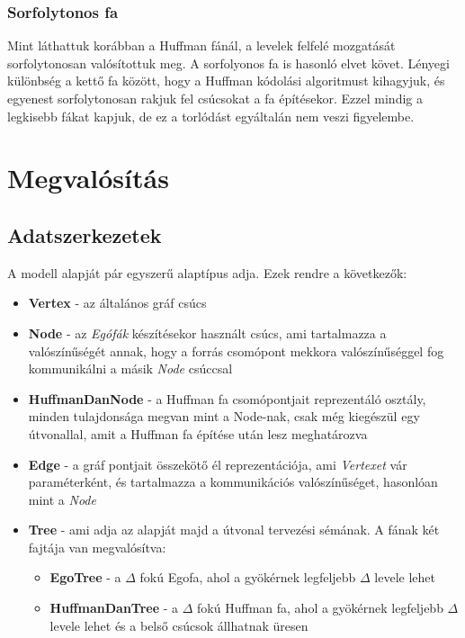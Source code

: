 \documentclass[12pt]{report}
\begin{document}
\subsection{Sorfolytonos fa}

Mint láthattuk korábban a Huffman fánál, a levelek felfelé mozgatását sorfolytonosan valósítottuk meg. A sorfolyonos fa is hasonló elvet követ.
Lényegi különbség a kettő fa között, hogy a Huffman kódolási algoritmust kihagyjuk, és egyenest sorfolytonosan rakjuk fel csúcsokat a fa építésekor.
Ezzel mindig a legkisebb fákat kapjuk, de ez a torlódást egyáltalán nem veszi figyelembe.

\chapter{Megvalósítás}


\section{Adatszerkezetek}

A modell alapját pár egyszerű alaptípus adja. Ezek rendre a következők:
\begin{itemize}
	\item \textbf{Vertex} - az általános gráf csúcs
	\item \textbf{Node} - az \textit{Egófák} készítésekor használt csúcs, ami tartalmazza a valószínűségét annak, hogy a forrás csomópont mekkora valószínűséggel fog kommunikálni a másik \textit{Node} csúccsal
	\item \textbf{HuffmanDanNode} - a Huffman fa csomópontjait reprezentáló osztály, minden tulajdonsága megvan mint a Node-nak, csak még kiegészül egy útvonallal, amit a Huffman fa építése után lesz meghatározva
	\item \textbf{Edge} - a gráf pontjait összekötő él reprezentációja, ami \textit{Vertexet} vár paraméterként, és tartalmazza a kommunikációs valószínűséget, hasonlóan mint a \textit{Node}
	\item \textbf{Tree} - ami adja az alapját majd a útvonal tervezési sémának. A fának két fajtája van megvalósítva:
	\begin{itemize}
		\item \textbf{EgoTree} - a $\Delta$ fokú Egofa, ahol a gyökérnek legfeljebb $\Delta$ levele lehet
		\item \textbf{HuffmanDanTree} - a $\Delta$ fokú Huffman fa, ahol a gyökérnek legfeljebb $\Delta$ levele lehet és a belső csúcsok állhatnak üresen
	\end{itemize}

	
\end{itemize}
	
\end{document}
